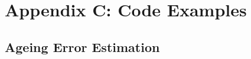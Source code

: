 \section{Appendix C: Code Examples}

\subsection{Ageing Error Estimation}
\hypertarget{AgeingError}{}


